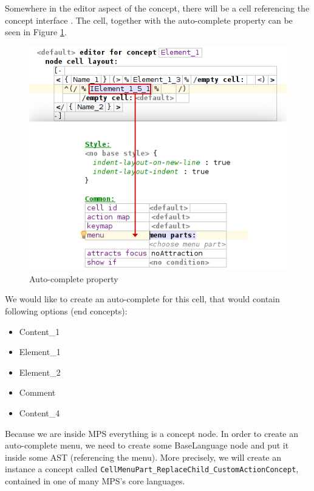 Somewhere in the editor aspect of the  concept, there will be a cell referencing the concept interface .
The cell, together with the auto-complete property can be seen in Figure \ref{fig:autocomplete_cell}.
\\

\begin{figure}[h]
	\centering
	\includegraphics[scale=0.7]{./img/autocomplete_cell.png}
	\caption{Auto-complete property}
	\label{fig:autocomplete_cell}
\end{figure}

We would like to create an auto-complete for this cell, that would contain following options (end concepts):

\begin{itemize}
	\itemsep0em
	\item Content{\_}1
	\item Element{\_}1
	\item Element{\_}2
	\item Comment
	\item Content{\_}4
\end{itemize}

Because we are inside MPS everything is a concept node.
In order to create an auto-complete menu, we need to create some BaseLanguage node and put it inside some AST (referencing the menu).
More precisely, we will create an instance a concept called \texttt{CellMenuPart{\_}ReplaceChild{\_}CustomActionConcept}, contained in one of many MPS's core languages.
\\

